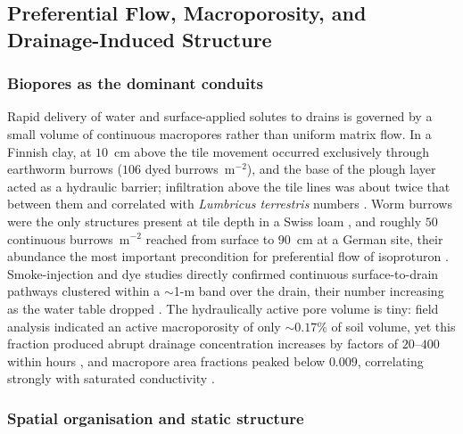 \subsection{Preferential Flow, Macroporosity, and Drainage-Induced Structure}

\subsubsection{Biopores as the dominant conduits}

Rapid delivery of water and surface-applied solutes to drains is governed by
a small volume of continuous macropores rather than uniform matrix flow. In
a Finnish clay, at $10$~cm above the tile movement occurred exclusively
through earthworm burrows ($106$ dyed burrows~m$^{-2}$), and the base of the
plough layer acted as a hydraulic barrier; infiltration above the tile lines
was about twice that between them and correlated with \textit{Lumbricus
terrestris} numbers \parencite{Shipitalo2004}. Worm burrows were the only
structures present at tile depth in a Swiss loam \parencite{Stamm2002}, and
roughly $50$ continuous burrows~m$^{-2}$ reached from surface to $90$~cm at a
German site, their abundance the most important precondition for preferential
flow of isoproturon \parencite{Zehe2001}. Smoke-injection and dye studies
directly confirmed continuous surface-to-drain pathways clustered within a
$\sim$1-m band over the drain, their number increasing as the water table
dropped \parencite{Nielsen2015,Petersen2012}. The hydraulically active pore
volume is tiny: field analysis indicated an active macroporosity of only
$\sim0.17\%$ of soil volume, yet this fraction produced abrupt drainage
concentration increases by factors of $20$--$400$ within hours
\parencite{Villholth1998}, and macropore area fractions peaked below
$0.009$, correlating strongly with saturated conductivity
\parencite{Frey2011}.

\subsubsection{Spatial organisation and static structure}

